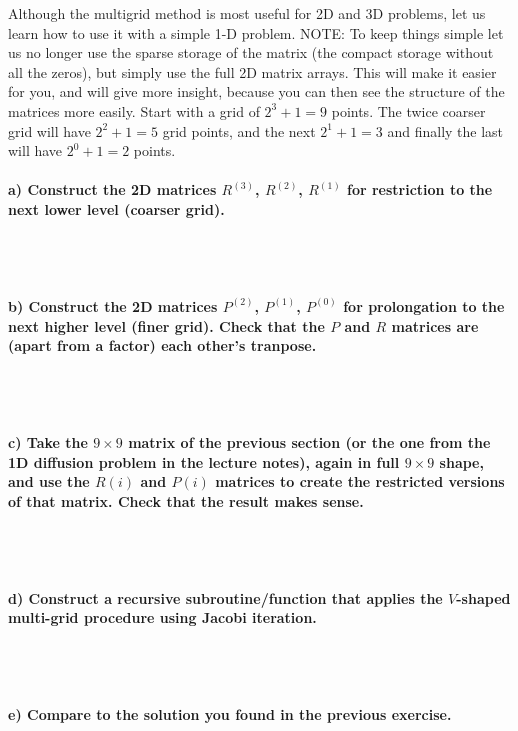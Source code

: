 Although the multigrid method is most useful for 2D and 3D problems, 
let us learn how to use it with a simple 1-D problem.
NOTE: To keep things simple let us no longer use the sparse storage of 
the matrix (the compact storage without all the zeros), but simply use 
the full 2D matrix arrays. This will make it easier for you, and will 
give more insight, because you can then see the structure of the 
matrices more easily.
Start with a grid of $2^3+1=9$ points. The twice coarser grid will have 
$2^2+1=5$ grid points, and the next $2^1+1=3$ and finally the last will 
have $2^0+1=2$ points.

\paragraph{
    a) Construct the 2D matrices $R^(3)$, $R^(2)$, $R^(1)$ for 
    restriction to the next lower level (coarser grid).
} \ \\
    \\

\paragraph{
    b) Construct the 2D matrices $P^(2)$, $P^(1)$, $P^(0)$ for 
    prolongation to the next higher level (finer grid). Check that 
    the $P$ and $R$ matrices are (apart from a factor) each other’s 
    tranpose.
} \ \\
    \\

\paragraph{
    c) Take the $9\times9$ matrix of the previous section (or the one 
    from the 1D diffusion problem in the lecture notes), again in full 
    $9\times9$ shape, and use the $R(i)$ and $P(i)$ matrices to create 
    the restricted versions of that matrix. Check that the result makes 
    sense.
} \ \\
    \\

\paragraph{
    d) Construct a recursive subroutine/function that applies the 
    $V$-shaped multi-grid procedure using Jacobi iteration.
} \ \\
    \\

\paragraph{
    e) Compare to the solution you found in the previous exercise.
} \ \\
    \\
